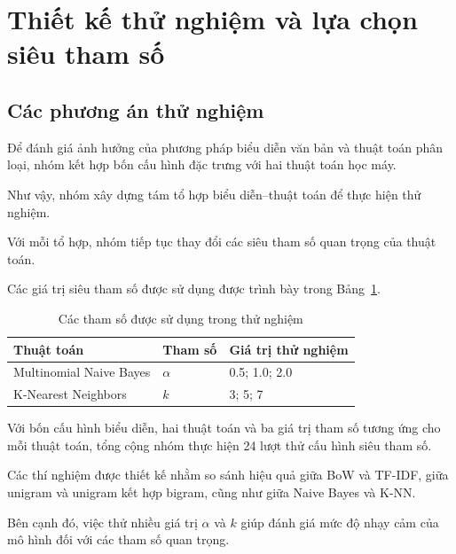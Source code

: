 
\section{Thiết kế thử nghiệm và lựa chọn siêu tham số}

\subsection{Các phương án thử nghiệm}

Để đánh giá ảnh hưởng của phương pháp biểu diễn văn bản và thuật toán phân loại, nhóm kết hợp bốn cấu hình đặc trưng với hai thuật toán học máy.

Như vậy, nhóm xây dựng tám tổ hợp biểu diễn--thuật toán để thực hiện thử nghiệm.

Với mỗi tổ hợp, nhóm tiếp tục thay đổi các siêu tham số quan trọng của thuật toán.

Các giá trị siêu tham số được sử dụng được trình bày trong Bảng~\ref{tab:tham-so-thu-nghiem}.

\begin{table}[H]
\centering
\caption{Các tham số được sử dụng trong thử nghiệm}
\label{tab:tham-so-thu-nghiem}
\renewcommand{\arraystretch}{1.15}

\begin{tabularx}{\textwidth}{|X|l|X|}
\hline

\textbf{Thuật toán}
& \textbf{Tham số}
& \textbf{Giá trị thử nghiệm} \\
\hline

Multinomial Naive Bayes
& $\alpha$
& 0.5; 1.0; 2.0 \\
\hline

K-Nearest Neighbors
& $k$
& 3; 5; 7 \\
\hline

\end{tabularx}
\end{table}

Với bốn cấu hình biểu diễn, hai thuật toán và ba giá trị tham số tương ứng cho mỗi thuật toán, tổng cộng nhóm thực hiện 24 lượt thử cấu hình siêu tham số.

Các thí nghiệm được thiết kế nhằm so sánh hiệu quả giữa BoW và TF-IDF, giữa unigram và unigram kết hợp bigram, cũng như giữa Naive Bayes và K-NN.

Bên cạnh đó, việc thử nhiều giá trị $\alpha$ và $k$ giúp đánh giá mức độ nhạy cảm của mô hình đối với các tham số quan trọng.


